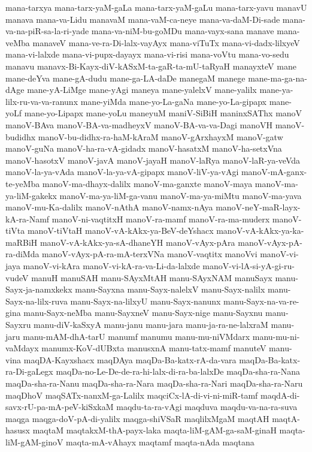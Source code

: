 {mana-tarxya
mana-tarx-yaM-gaLa
mana-tarx-yaM-gaLu
mana-tarx-yavu
manavU
manava
mana-va-Lidu
manavaM
mana-vaM-ca-neye
mana-va-daM-Di-sade
mana-va-na-piR-sa-la-ri-yade
mana-va-niM-bu-goMDu
mana-vayx-sana
manave
mana-veMba
manaveV
mana-ve-ra-Di-lalx-vayAyx
mana-viTuTx
mana-vi-dadx-lilxyeV
mana-vi-lalxde
mana-vi-pupx-dayayx
mana-vi-risi
mana-voVtu
mana-vo-sedu
manavu
manavx-Bi-Kayx-diV-kASxM-ta-gaR-ta-mU-taRyaH
manayxteV
mane
mane-deYva
mane-gA-dudu
mane-ga-LA-daDe
manegaM
manege
mane-ma-ga-na-dAge
mane-yA-LiMge
mane-yAgi
maneya
mane-yalelxV
mane-yalilx
mane-ya-lilx-ru-va-va-ranunx
mane-yiMda
mane-yo-La-gaNa
mane-yo-La-gipapx
mane-yoLf
mane-yo-Lipapx
mane-yoLu
maneyuM
maniV-SiBiH
maninxSAThx
manoV
manoV-BAva
manoV-BA-va-madheyxV
manoV-BA-va-va-Dagi
manoVH
manoV-budidhx
manoV-bu-didhx-ra-haM-kAraM
manoV-gArxhayxM
manoV-gatw
manoV-guNa
manoV-ha-ra-vA-gidadx
manoV-hasatxM
manoV-ha-setxVna
manoV-hasotxV
manoV-javA
manoV-jayaH
manoV-laRya
manoV-laR-ya-veVda
manoV-la-ya-vAda
manoV-la-ya-vA-gipapx
manoV-liV-ya-vAgi
manoV-mA-ganx-te-yeMba
manoV-ma-dhayx-dalilx
manoV-ma-ganxte
manoV-maya
manoV-ma-ya-liM-gakekx
manoV-ma-ya-liM-ga-vanu
manoV-ma-ya-miMtu
manoV-ma-yava
manoV-mu-Ka-dalilx
manoV-nAthA
manoV-namx-nAya
manoV-neY-maR-layx-kA-ra-Namf
manoV-ni-vaqtitxH
manoV-ra-mamf
manoV-ra-ma-muderx
manoV-tiVta
manoV-tiVtaH
manoV-vA-kAkx-ya-BeV-deYshacx
manoV-vA-kAkx-ya-ka-maRBiH
manoV-vA-kAkx-ya-sA-dhaneYH
manoV-vAyx-pAra
manoV-vAyx-pA-ra-diMda
manoV-vAyx-pA-ra-mA-terxVNa
manoV-vaqtitx
manoVvi
manoV-vi-jaya
manoV-vi-kAra
manoV-vi-kA-ra-va-Li-da-lalxde
manoV-vi-lA-si-yA-gi-ru-vudeV
manuH
manuSAH
manu-SAyxMtAH
manu-SAyxNAM
manuSayx
manu-Sayx-ja-namxkekx
manu-Sayxna
manu-Sayx-nalelxV
manu-Sayx-nalilx
manu-Sayx-na-lilx-ruva
manu-Sayx-na-lilxyU
manu-Sayx-nanunx
manu-Sayx-na-va-re-gina
manu-Sayx-neMba
manu-SayxneV
manu-Sayx-nige
manu-Sayxnu
manu-Sayxru
manu-diV-kaSxyA
manu-janu
manu-jara
manu-ja-ra-ne-lalxraM
manu-jaru
manu-mAM-dhA-tarU
manumf
manumu
manu-mu-niVMdarx
manu-mu-ni-vaMdayx
manumx-KoV-dUBxta
manusxnA
manu-tatx-mamf
manuteV
manu-vina
maqDA-Kayxshacx
maqDAya
maqDa-Ba-katx-rA-da-vara
maqDa-Ba-katx-ra-Di-gaLegx
maqDa-no-Le-De-de-ra-hi-lalx-di-ra-ba-lalxDe
maqDa-sha-ra-Nana
maqDa-sha-ra-Nanu
maqDa-sha-ra-Nara
maqDa-sha-ra-Nari
maqDa-sha-ra-Naru
maqDhoV
maqSATx-nanxM-ga-Lalilx
maqciCx-lA-di-vi-ni-miR-tamf
maqdA-di-savx-rU-pa-mA-peV-kiSxkaM
maqdu-ta-ra-vAgi
maqduva
maqdu-va-na-ra-suva
maqga
maqga-doV-pA-di-yalilx
maqga-shiVSaR
maqlilxMgaM
maqtAH
maqtA-hasusx
maqtaM
maqtakxM-thA-payx-laka
maqta-liM-gAM-ga-saM-ginaH
maqta-liM-gAM-ginoV
maqta-mA-vAhayx
maqtamf
maqta-nAda
maqtana
}
